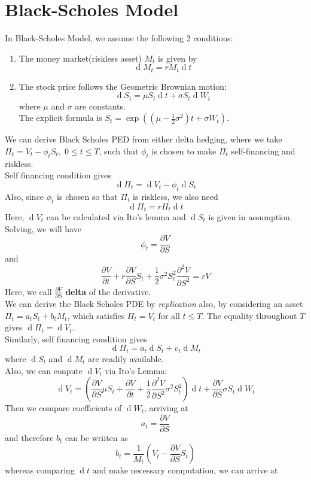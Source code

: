\documentclass[12pt]{article}
\theoremstyle{definition}
\DeclareMathOperator{\diff}{d}
\begin{document}
\section{Black-Scholes Model}
In Black-Scholes Model, we assume the following 2 conditions:
\begin{enumerate}
  \item The money market(riskless asset) $M_t$ is given by
  \[
\diff M_t = rM_t\diff t
  \]
  \item The stock price follows the Geometric Brownian motion:
  \[
\diff S_t = \mu S_t\diff t +\sigma S_t\diff W_t
  \]
  where $\mu$ and $\sigma$ are constants.\\
  The explicit formula is $S_t=\exp((\mu-\frac{1}{2}\sigma^2)t+\sigma W_t)$.
\end{enumerate}
We can derive Black Scholes PED from either delta hedging, where we take $\Pi_t=V_t-\phi_tS_t, \;0\leq t\leq T$, such that $\phi_t$ is chosen to make $\Pi_t$ self-financing and riskless.\\
Self financing condition gives
\[
\diff \Pi_t=\diff V_t - \phi_t\diff S_t
\]
Also, since $\phi_t$ is chosen so that $\Pi_t$ is riskless, we also need
\[
\diff \Pi_t = r\Pi_t\diff t
\]
Here, $\diff V_t$ can be calculated via Ito's lemma and $\diff S_t$ is given in assumption. Solving, we will have
\[
\phi_t = \frac{\partial V}{\partial S}
\]
and
\[
\frac{\partial V}{\partial t}+r\frac{\partial V}{\partial S}S_t +\frac{1}{2}\sigma^2S_t^2\frac{\partial^2 V}{\partial S^2}=rV
\]
Here, we call $\frac{\partial V}{\partial S}$ \textbf{delta} of the derivative.\\
We can derive the Black Scholes PDE by \textit{replication} also, by considering an asset $\Pi_t=a_tS_t+b_tM_t$, which satisfies $\Pi_t=V_t$ for all $t\leq T$. The equality throughout $T$ gives $\diff \Pi_t=\diff V_t$.\\
Similarly, self financing condition gives
\[
\diff \Pi_t=a_t\diff S_t+v_t\diff M_t
\]
where $\diff S_t$ and $\diff M_t$ are readily available.\\
Also, we can conpute $\diff V_t$ via Ito's Lemma:
\[
\diff V_t = (\frac{\partial V}{\partial S}\mu S_t+\frac{\partial V}{\partial t}+\frac{1}{2}\frac{\partial^2V}{\partial S^2}\sigma^2S_t^2)\diff t+\frac{\partial V}{\partial S}\sigma S_t\diff W_t
\]
Then we compare coefficients of $\diff W_t$, arriving at
\[
a_t=\frac{\partial V}{\partial S}
\]
and therefore $b_t$ can be wriiten as
\[
b_t=\frac{1}{M_t}(V_t-\frac{\partial V}{\partial S}S_t)
\]
whereas comparing $\diff t$ and make necessary computation, we can arrive at
\end{document}
